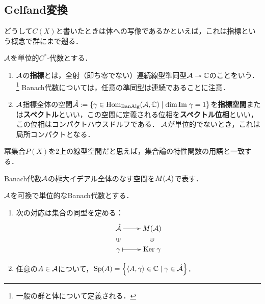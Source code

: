\documentclass[uplatex,dvipdfmx]{jsreport}
\begin{document}
\subsection{Gelfand変換}

\begin{tcolorbox}[colframe=ForestGreen, colback=ForestGreen!10!white,breakable,colbacktitle=ForestGreen!40!white,coltitle=black,fonttitle=\bfseries\sffamily,
title=]
    どうして$C(X)$と書いたときは体への写像であるかといえば，これは指標という概念で群にまで遡る．
\end{tcolorbox}

\begin{definition}\label{def-character}
    $\mathcal{A}$を単位的$C^*$-代数とする．
    \begin{enumerate}
        \item $\mathcal{A}$の\textbf{指標}とは，全射（即ち零でない）連続線型準同型$\mathcal{A}\twoheadrightarrow\mathbb{C}$のことをいう．\footnote{一般の群と体について定義される．}
        Banach代数については，任意の準同型は連続であることに注意．
        \item $\mathcal{A}$指標全体の空間$\hat{\mathcal{A}}:=\left\{\gamma\in\mathrm{Hom}_{\mathrm{Ban}\mathrm{Alg}}(\mathcal{A},\mathbb{C})\mid\dim\mathrm{Im}\;\gamma=1\right\}$を\textbf{指標空間}または\textbf{スペクトル}といい，この空間に定義される位相を\textbf{スペクトル位相}といい，この位相はコンパクトハウスドルフである．
        $\mathcal{A}$が単位的でないとき，これは局所コンパクトとなる．
    \end{enumerate}
\end{definition}
\begin{remark}
    冪集合$P(X)$を$2$上の線型空間だと思えば，集合論の特性関数の用語と一致する．
\end{remark}

\begin{notation}
    Banach代数$\mathcal{A}$の極大イデアル全体のなす空間を$M(\mathcal{A})$で表す．
\end{notation}

\begin{proposition}
    $\mathcal{A}$を可換で単位的なBanach代数とする．
    \begin{enumerate}
        \item 次の対応は集合の同型を定める：
        \[\xymatrix@R-2pc{
            \hat{\A}\ar[r]&M(\A)\\
            \rotatebox[origin=c]{90}{$\in$}&\rotatebox[origin=c]{90}{$\in$}\\
            \gamma\ar@{|->}[r]&\Ker\gamma
        }\]
        \item 任意の$A\in\mathcal{A}$について，$\mathrm{Sp}(A)=\left\{\langle A,\gamma\rangle\in\mathbb{C}\mid\gamma\in\hat{\mathcal{A}}\right\}$．
    \end{enumerate}
\end{proposition}
\end{document}
